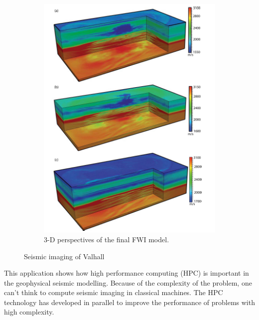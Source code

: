 \begin{figure}
\begin{subfigure}[b]{0.4\textwidth}
    \includegraphics[width=\textwidth]{images/3Dsim3.png}
    \caption{3-D perspectives of the final FWI model.}
    \label{sim3}
  \end{subfigure}
  \caption{Seismic imaging of Valhall \cite{Operto2015}}
\end{figure}

This application shows how high performance computing (HPC) is important in the geophysical seismic modelling. Because of the complexity of the problem, one can't think to compute seismic imaging in classical machines. The HPC technology has developed in parallel to improve the performance of problems with high complexity.